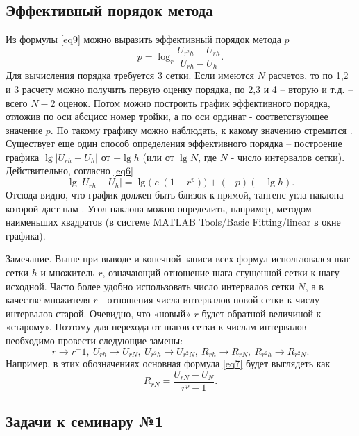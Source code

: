 \subsection{Эффективный порядок метода}
Из формулы \eqref{eq9} можно выразить эффективный порядок метода $p$
\begin{equation} \label{eq13}
p = \log_r \frac{U_{r^2h} - U_{rh}}{U_{rh} - U_h}.
\end{equation}
Для вычисления порядка требуется 3 сетки. Если имеются $N$ расчетов, то по 1,2 и 3 расчету можно получить первую оценку порядка, по 2,3 и 4 – вторую и т.д. – всего $N-2$ оценок. Потом можно построить график эффективного порядка, отложив по оси абсцисс номер тройки, а по оси ординат - соответствующее значение $p$. По такому графику можно наблюдать, к какому значению стремится .
Существует еще один способ определения эффективного порядка – построение графика $\lg\left| U_{rh} - U_h \right|$ от $-\lg h$ (или от $\lg N$, где $N$ - число интервалов сетки). Действительно, согласно \eqref{eq6}
\begin{equation} \label{eq14}
\lg \left| U_{rh} - U_h \right| = \lg \big( \left| c \right| \left( 1 - r^p \right) \big) + \left( -p \right) \left( - \lg h \right).
\end{equation}
Отсюда видно, что график должен быть близок к прямой, тангенс угла наклона которой даст нам . Угол наклона можно определить, например, методом наименьших квадратов (в системе MATLAB Tools/Basic Fitting/linear в окне графика). 

Замечание. Выше при выводе и конечной записи всех формул использовался шаг сетки $h$ и множитель $r$, означающий отношение шага сгущенной сетки к шагу исходной. Часто более удобно использовать число интервалов сетки $N$, а в качестве множителя $r$ - отношения числа интервалов новой сетки к числу интервалов старой. Очевидно, что «новый» $r$ будет обратной величиной к «старому». Поэтому для перехода от шагов сетки к  числам интервалов необходимо провести следующие замены:
\begin{equation} \label{eq15}
r \rightarrow r^-1, \ U_{rh} \rightarrow U_{rN}, \ U_{r^2h} \rightarrow U_{r^2N}, \ R_{rh} \rightarrow R_{rN}, \ R_{r^2h} \rightarrow R_{r^2N}.
\end{equation}
Например, в этих обозначениях основная формула \eqref{eq7} будет выглядеть как
\begin{equation} \label{eq16}
R_{rN} = \frac{U_{rN} - U_N}{r^p - 1}.
\end{equation}

\subsection{Задачи к семинару №1}

